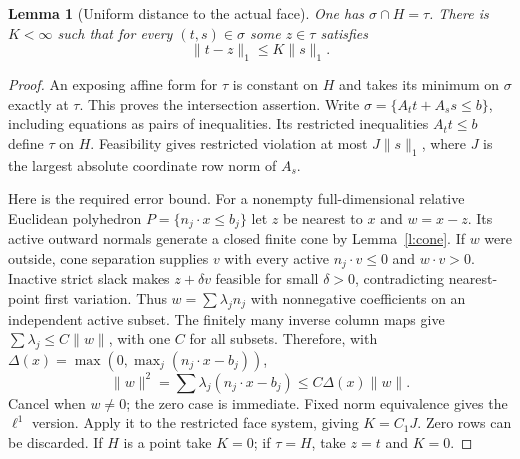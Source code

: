 \documentclass[11pt]{article}
\newtheorem{lemma}[theorem]{Lemma}
\theoremstyle{definition}\newtheorem{definition}[theorem]{Definition}
\theoremstyle{remark}\newtheorem{remark}[theorem]{Remark}
\begin{document}
\begin{lemma}[Uniform distance to the actual face]\label{l:distance}
One has $\sigma\cap H=\tau$. There is $K<\infty$ such that for every $(t,s)\in\sigma$ some $z\in\tau$ satisfies
\[
 \|t-z\|_1\leq K\|s\|_1.
\]
\end{lemma}
\begin{proof}
An exposing affine form for $\tau$ is constant on $H$ and takes its minimum on $\sigma$ exactly at $\tau$. This proves the intersection assertion. Write $\sigma=\{A_t t+A_s s\leq b\}$, including equations as pairs of inequalities. Its restricted inequalities $A_t t\leq b$ define $\tau$ on $H$. Feasibility gives restricted violation at most $J\|s\|_1$, where $J$ is the largest absolute coordinate row norm of $A_s$.

Here is the required error bound. For a nonempty full-dimensional relative Euclidean polyhedron $P=\{n_j\cdot x\leq b_j\}$ let $z$ be nearest to $x$ and $w=x-z$. Its active outward normals generate a closed finite cone by Lemma~\ref{l:cone}. If $w$ were outside, cone separation supplies $v$ with every active $n_j\cdot v\leq0$ and $w\cdot v>0$. Inactive strict slack makes $z+\delta v$ feasible for small $\delta>0$, contradicting nearest-point first variation. Thus $w=\sum\lambda_jn_j$ with nonnegative coefficients on an independent active subset. The finitely many inverse column maps give $\sum\lambda_j\leq C\|w\|$, with one $C$ for all subsets. Therefore, with $\Delta(x)=\max(0,\max_j(n_j\cdot x-b_j))$,
\[
 \|w\|^2=\sum\lambda_j(n_j\cdot x-b_j)
 \leq C\Delta(x)\|w\|.
\]
Cancel when $w\ne0$; the zero case is immediate. Fixed norm equivalence gives the $\ell^1$ version. Apply it to the restricted face system, giving $K=C_1J$. Zero rows can be discarded. If $H$ is a point take $K=0$; if $\tau=H$, take $z=t$ and $K=0$.
\end{proof}
\end{document}
